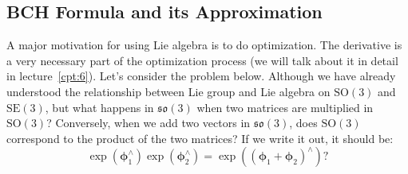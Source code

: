 \subsection{BCH Formula and its Approximation}
A major motivation for using Lie algebra is to do optimization. The derivative is a very necessary part of the optimization process (we will talk about it in detail in lecture~\ref{cpt:6}). Let's consider the problem below. Although we have already understood the relationship between Lie group and Lie algebra on $\mathrm{SO}(3)$ and $\mathrm{SE}(3)$, but what happens in $\mathfrak{so}(3)$ when two matrices are multiplied in $\mathrm{SO}(3)$? Conversely, when we add two vectors in $\mathfrak{so}(3)$, does $\mathrm{SO}(3)$ correspond to the product of the two matrices? If we write it out, it should be:
\[
\exp \left( {\boldsymbol{\phi}_1^\wedge } \right)\exp \left( {\boldsymbol{\phi}_2^\wedge}\right) = \exp \left( {{{\left( {{\boldsymbol{\phi} _1} + {\boldsymbol{\phi} _2}} \right)}^ \wedge }} \right) ?
\]

